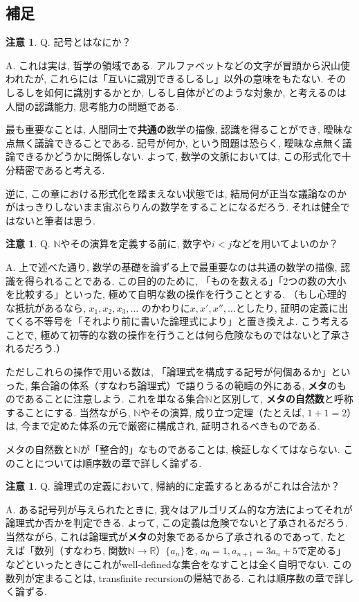 \documentclass[a4paper, twoside]{bxjsarticle}
\newcommand{\nat}{\mathbb{N}}
\newcommand{\rea}{\mathbb{R}}
\theoremstyle{definition}
\newtheorem{rem}[thm]{注意}
\begin{document}
    \subsection{補足}
        \begin{rem}
            Q. 記号とはなにか？
            
            A. これは実は, 哲学の領域である. アルファベットなどの文字が冒頭から沢山使われたが, これらには「互いに識別できるしるし」以外の意味をもたない. そのしるしを如何に識別するかとか, しるし自体がどのような対象か, と考えるのは人間の認識能力, 思考能力の問題である. 
            
            最も重要なことは, 人間同士で\textbf{共通の}数学の描像, 認識を得ることができ, 曖昧な点無く議論できることである. 記号が何か, という問題は恐らく, 曖昧な点無く議論できるかどうかに関係しない. よって, 数学の文脈においては, この形式化で十分精密であると考える.
            
            逆に, この章における形式化を踏まえない状態では, 結局何が正当な議論なのかがはっきりしないまま宙ぶらりんの数学をすることになるだろう. それは健全ではないと筆者は思う.
        \end{rem}
        \begin{rem}
            Q. $\nat$やその演算を定義する前に, 数字や$i < j$などを用いてよいのか？
            
            A. 上で述べた通り, 数学の基礎を論ずる上で最重要なのは共通の数学の描像, 認識を得られることである. この目的のために, 「ものを数える」「2つの数の大小を比較する」といった, 極めて自明な数の操作を行うこととする. （もし心理的な抵抗があるなら, $x_1, x_2, x_3, \dots$ のかわりに$x, x', x'', \dots$としたり, 証明の定義に出てくる不等号を「それより前に書いた論理式により」と置き換えよ. こう考えることで, 極めて初等的な数の操作を行うことは何ら危険なものではないと了承されるだろう.） 
            
            ただしこれらの操作で用いる数は, 「論理式を構成する記号が何個あるか」といった, 集合論の体系（すなわち論理式）で語りうるの範疇の外にある, \textbf{メタ}のものであることに注意しよう. これを単なる集合$\nat$と区別して, \textbf{メタの自然数}と呼称することにする. 当然ながら, $\nat$やその演算, 成り立つ定理（たとえば, $1+1=2$）は, 今まで定めた体系の元で厳密に構成され, 証明されるべきものである.
            
            メタの自然数と$\nat$が「整合的」なものであることは, 検証しなくてはならない. このことについては順序数の章で詳しく論ずる.
        \end{rem}
        \begin{rem}
            Q. 論理式の定義において, 帰納的に定義するとあるがこれは合法か？
            
            A. ある記号列が与えられたときに, 我々はアルゴリズム的な方法によってそれが論理式か否かを判定できる. よって, この定義は危険でないと了承されるだろう. 当然ながら, これは論理式が\textbf{メタ}の対象であるから了承されるのであって, たとえば「数列（すなわち, 関数$\nat \to \rea$）$\{a_n\}$を, $a_0=1, a_{n+1}=3a_n+5$で定める」などといったときにこれがwell-definedな集合をなすことは全く自明でない. この数列が定まることは, transfinite recursionの帰結である. これは順序数の章で詳しく論ずる.
        \end{rem}
\end{document}
